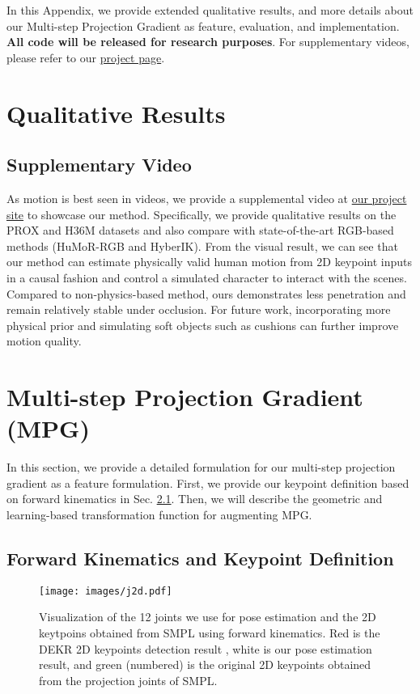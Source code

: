 In this Appendix, we provide extended qualitative results, and more details about our Multi-step Projection Gradient as feature, evaluation, and implementation. \textbf{All code will be released for research purposes}. For supplementary videos, please refer to our \href{https://zhengyiluo.github.io/projects/embodied_pose/}{project page}. 

\section{Qualitative Results}

\subsection{Supplementary Video}
As motion is best seen in videos, we provide a supplemental video at \href{https://zhengyiluo.github.io/projects/embodied_pose/}{our project site} to showcase our method. Specifically, we provide qualitative results on the PROX and H36M datasets and also compare with state-of-the-art RGB-based methods (HuMoR-RGB and HyberIK). From the visual result, we can see that our method can estimate physically valid human motion from 2D keypoint inputs in a causal fashion and control a simulated character to interact with the scenes. Compared to non-physics-based method, ours demonstrates less penetration and remain relatively stable under occlusion. For future work, incorporating more physical prior and simulating soft objects such as cushions can further improve motion quality. 





\section{Multi-step Projection Gradient (MPG)}
In this section, we provide a detailed formulation for our multi-step projection gradient as a feature formulation. First, we provide our keypoint definition based on forward kinematics in Sec. \ref{sec:keypoints}. Then, we will describe the geometric and learning-based transformation function  for augmenting MPG. 

\subsection{Forward Kinematics and Keypoint Definition}
\label{sec:keypoints}
\begin{wrapfigure}{R}{0.5\textwidth}
\vspace{-5mm}
\caption{Visualization of the 12 joints we use for pose estimation and the 2D keytpoins obtained from SMPL using forward kinematics. Red is the DEKR 2D keypoints detection result \cite{Geng2021BottomUpHP}, white is our pose estimation result, and green (numbered) is the original 2D keypoints obtained from the projection joints of SMPL.}
\label{fig:joints2d}
\centering
\texttt{[image: images/j2d.pdf]}
\vspace{-5mm}
\end{wrapfigure}

